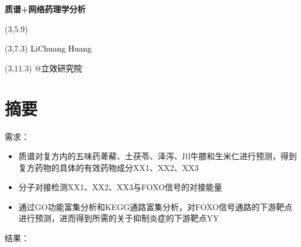 \documentclass[
]{article}
\author{}
\date{\vspace{-2.5em}}
\providecommand{\tightlist}{%
  \setlength{\itemsep}{0pt}\setlength{\parskip}{0pt}}
\begin{document}
\begin{titlepage} 
\begin{center} \textbf{\Huge 质谱+网络药理学分析}
\vspace{4em} \begin{textblock}{10}(3,5.9) \huge
\textbf{\textcolor{white}{2024-02-01}}
\end{textblock} \begin{textblock}{10}(3,7.3)
\Large \textcolor{black}{LiChuang Huang}
\end{textblock} \begin{textblock}{10}(3,11.3)
\Large \textcolor{black}{@立效研究院}
\end{textblock} \end{center} \end{titlepage}
\restoregeometry


\tableofcontents

\listoffigures

\listoftables

\newpage


\hypertarget{abstract}{%
\section{摘要}\label{abstract}}

需求：

\begin{itemize}
\tightlist
\item
  质谱对复方内的五味药萆薢、土茯苓、泽泻、川牛膝和生米仁进行预测，得到复方药物的具体的有效药物成分XX1、XX2、XX3
\item
  分子对接检测XX1、XX2、XX3与FOXO信号的对接能量
\item
  通过GO功能富集分析和KEGG通路富集分析，对FOXO信号通路的下游靶点进行预测，进而得到所需的关于抑制炎症的下游靶点YY
\end{itemize}

结果：
\end{document}
